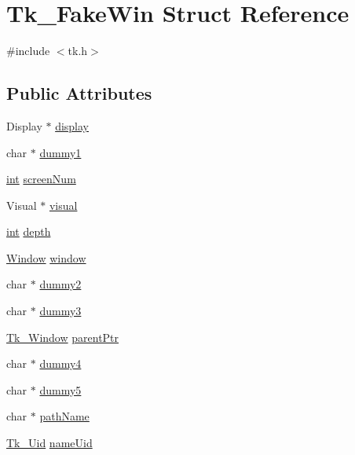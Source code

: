 \hypertarget{struct_tk___fake_win}{}\section{Tk\+\_\+\+Fake\+Win Struct Reference}
\label{struct_tk___fake_win}


{\ttfamily \#include $<$tk.\+h$>$}

\subsection*{Public Attributes}
\begin{DoxyCompactItemize}
\item 
Display $\ast$ \hyperlink{struct_tk___fake_win_a09d36b507895acb199cbae58c3e1974e}{display}
\item 
char $\ast$ \hyperlink{struct_tk___fake_win_a7556ea2b1ae15fc70e41d14535bcaac3}{dummy1}
\item 
\hyperlink{tk_8h_a83f82f76e7fed06f4c49d2db94028a6d}{int} \hyperlink{struct_tk___fake_win_ad61f57629f72955b69e92fbb74e30174}{screen\+Num}
\item 
Visual $\ast$ \hyperlink{struct_tk___fake_win_af66780cc2c20348a6103afd45ba10bb2}{visual}
\item 
\hyperlink{tk_8h_a83f82f76e7fed06f4c49d2db94028a6d}{int} \hyperlink{struct_tk___fake_win_ab5aa14fa5a96724bcd1c9d3cf62869aa}{depth}
\item 
\hyperlink{tk_8h_a98fe30ba305baa90aa6ae1f474c1e338}{Window} \hyperlink{struct_tk___fake_win_a6677dcc720dc9930caa2a103869d7c94}{window}
\item 
char $\ast$ \hyperlink{struct_tk___fake_win_a06d75c80abbe68af44597b6af0cadef3}{dummy2}
\item 
char $\ast$ \hyperlink{struct_tk___fake_win_a3c9bd28b705af86cb8d42d748f64b3e6}{dummy3}
\item 
\hyperlink{tk_8h_ab756137de3ee74edc2501bd0d761e37c}{Tk\+\_\+\+Window} \hyperlink{struct_tk___fake_win_a2cfb563043080a6ac3c8cd6016af3ec5}{parent\+Ptr}
\item 
char $\ast$ \hyperlink{struct_tk___fake_win_ae35dcec0e5f7808319ee7bf2d1916c8f}{dummy4}
\item 
char $\ast$ \hyperlink{struct_tk___fake_win_a49da8c375d5dfda0ad455bc36cfb0fc1}{dummy5}
\item 
char $\ast$ \hyperlink{struct_tk___fake_win_ab285506d5e282f3184043ab875f5146f}{path\+Name}
\item 
\hyperlink{tk_8h_aab6f7e0c4f113c8e02feee260e7c4414}{Tk\+\_\+\+Uid} \hyperlink{struct_tk___fake_win_a8afbaefad495d4a913a37a9333ff0967}{name\+Uid}

\end{DoxyCompactItemize}
